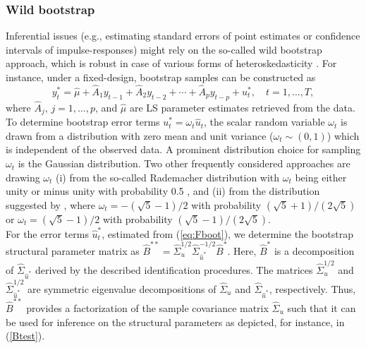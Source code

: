 \documentclass[nojss]{jss}\usepackage[]{graphicx}\usepackage[]{color}
\begin{document}
\subsubsection*{Wild bootstrap}\label{sec:wildboot}
Inferential issues (e.g., estimating standard errors of point estimates or confidence intervals of impulse-responses) might rely on the so-called wild bootstrap approach, which is robust in case of various forms of heteroskedasticity \citep{GK2004, HAHE2009}. For instance, under a fixed-design, bootstrap samples can be constructed as
\begin{equation}\label{eq:Fboot}
y_{t}^* = \widehat{\mu} + \widehat{A}_1 y_{t-1} + \widehat{A}_2 y_{t-2}  + \cdots
+ \widehat{A}_p y_{t-p}   + u_t^*,
\quad t=1,\ldots,T,
\end{equation}
where $\widehat{A}_j,\,j=1,\ldots,p$, and $\widehat{\mu}$  are LS parameter estimates retrieved from the data. To determine bootstrap error terms $u^*_t=\omega_t\widehat{u}_t$, the scalar random variable $\omega_t$ is drawn from a distribution with zero mean and unit variance ($\omega_t \sim (0,1)$) which is independent of the observed data. A prominent distribution choice for sampling $\omega_t$ is the Gaussian distribution. Two other frequently considered approaches are drawing  $\omega_t$ (i) from the so-called Rademacher distribution with $\omega_t$ being either unity or minus unity with probability 0.5 \citep{Liu1988}, and (ii) from the distribution suggested by \cite{Mammen1993}, where $\omega_t = -(\sqrt{5} - 1)/2$ with probability $(\sqrt{5} + 1)/(2\sqrt{5})$ or $\omega_t = (\sqrt{5} - 1)/2$ with probability $(\sqrt{5} - 1)/(2\sqrt{5})$.\\
For the error terms $\widehat{u}^*_t$, estimated from (\ref{eq:Fboot}), we determine the bootstrap structural parameter matrix as $\widehat{B}^{**}=\widehat{\Sigma}_{u}^{1/2}\widehat{\Sigma}^{-1/2}_{\widehat{u}^*}\widehat{B}^*.$ Here, $\widehat{B}^*$ is a decomposition of $\widehat{\Sigma}_{\hat{u}^*}$ derived by the described identification procedures. The matrices $\widehat{\Sigma}_{u}^{1/2}$ and $\widehat{\Sigma}^{1/2}_{\widehat{u}^*}$ are symmetric eigenvalue decompositions of $\widehat{\Sigma}_{u}$ and $\widehat{\Sigma}_{\widehat{u}^*}$, respectively. Thus, $\widehat{B}^{**}$ provides a factorization of the sample covariance matrix $\widehat{\Sigma}_u$ such that it can be used for inference on the structural parameters as depicted, for instance, in (\ref{Btest}).
\end{document}
